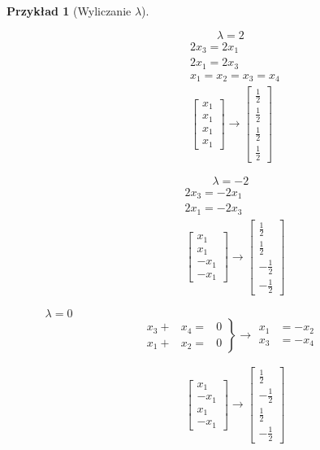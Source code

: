 \documentclass[a4paper,12pt]{article}
\theoremstyle{definition}%
\newtheorem{example}{Przykład}
\newtheorem*{example*}{Przykład} %
\theoremstyle{definition}
\theoremstyle{problem}
\begin{document}
\begin{example*}[Wyliczanie $\lambda$]
\begin{enumerate}[label=\Roman*.]
\begin{itemize}
\begin{multicols}{2}
$$\lambda = 2$$
\begin{align*}
&2x_3=2x_1\\
&2x_1=2x_3\\
&x_1=x_2=x_3=x_4\\
&\begin{bmatrix}
x_1\\x_1\\x_1\\x_1
\end{bmatrix}\rightarrow
\begin{bmatrix}
\frac{1}{2}\\\frac{1}{2}\\\frac{1}{2}\\\frac{1}{2}
\end{bmatrix}
\end{align*}

$$\lambda = -2$$
\begin{align*}
&2x_3=-2x_1\\
&2x_1=-2x_3\\
&\begin{bmatrix}
x_1\\x_1\\-x_1\\-x_1
\end{bmatrix}\rightarrow
\begin{bmatrix}
\frac{1}{2}\\\frac{1}{2}\\-\frac{1}{2}\\-\frac{1}{2}
\end{bmatrix}
\end{align*}
\end{multicols}

\item[$\lambda = 0$] 
$$\left.\begin{matrix}
x_3+&x_4=&0\\
x_1+&x_2=&0
\end{matrix}\right\}\rightarrow \begin{matrix}
x_1 &= -x_2\\
x_3 &= -x_4
\end{matrix}$$

\begin{multicols}{2}
\begin{align*}
&\begin{bmatrix}
x_1\\-x_1\\x_1\\-x_1
\end{bmatrix}\rightarrow
\begin{bmatrix}
\frac{1}{2}\\-\frac{1}{2}\\\frac{1}{2}\\-\frac{1}{2}
\end{bmatrix}
\end{align*}


\end{multicols}
\end{itemize}
\end{enumerate}
\end{example*}
\end{document}
